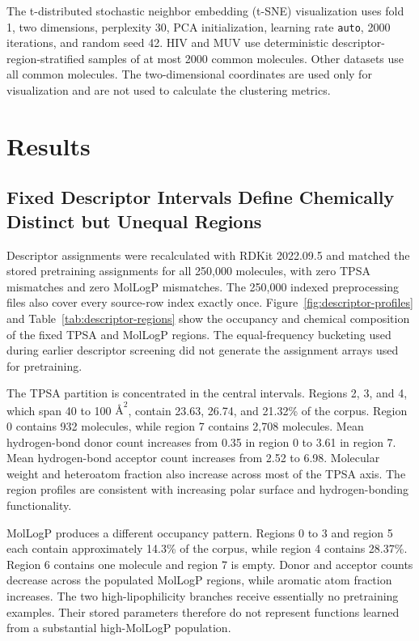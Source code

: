 \documentclass[journal=jcisd8,manuscript=article]{achemso}
\begin{document}
The t-distributed stochastic neighbor embedding (t-SNE) visualization uses fold 1, two dimensions, perplexity 30, PCA initialization, learning rate \texttt{auto}, 2000 iterations, and random seed 42. HIV and MUV use deterministic descriptor-region-stratified samples of at most 2000 common molecules. Other datasets use all common molecules. The two-dimensional coordinates are used only for visualization and are not used to calculate the clustering metrics.


\section{Results}
\label{sec:results}

\subsection{Fixed Descriptor Intervals Define Chemically Distinct but Unequal Regions}

Descriptor assignments were recalculated with RDKit 2022.09.5 and matched the stored pretraining assignments for all 250,000 molecules, with zero TPSA mismatches and zero MolLogP mismatches. The 250,000 indexed preprocessing files also cover every source-row index exactly once. Figure~\ref{fig:descriptor-profiles} and Table~\ref{tab:descriptor-regions} show the occupancy and chemical composition of the fixed TPSA and MolLogP regions. The equal-frequency bucketing used during earlier descriptor screening did not generate the assignment arrays used for pretraining.

The TPSA partition is concentrated in the central intervals. Regions 2, 3, and 4, which span 40 to 100 \(\text{\AA}^2\), contain 23.63, 26.74, and 21.32\% of the corpus. Region 0 contains 932 molecules, while region 7 contains 2,708 molecules. Mean hydrogen-bond donor count increases from 0.35 in region 0 to 3.61 in region 7. Mean hydrogen-bond acceptor count increases from 2.52 to 6.98. Molecular weight and heteroatom fraction also increase across most of the TPSA axis. The region profiles are consistent with increasing polar surface and hydrogen-bonding functionality.

MolLogP produces a different occupancy pattern. Regions 0 to 3 and region 5 each contain approximately 14.3\% of the corpus, while region 4 contains 28.37\%. Region 6 contains one molecule and region 7 is empty. Donor and acceptor counts decrease across the populated MolLogP regions, while aromatic atom fraction increases. The two high-lipophilicity branches receive essentially no pretraining examples. Their stored parameters therefore do not represent functions learned from a substantial high-MolLogP population.
\end{document}
